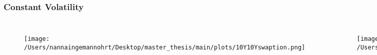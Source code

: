 \documentclass{beamer}
\begin{document}
\begin{frame}
    \frametitle{\textcolor{KUrod}{Constant Volatility}}

    \begin{columns}
        \begin{figure}
            \texttt{[image: /Users/nannaingemannohrt/Desktop/master\_thesis/main/plots/10Y10Yswaption.png]}
        \end{figure}
        
        \begin{figure}
            \texttt{[image: /Users/nannaingemannohrt/Desktop/master\_thesis/main/plots/10Y10Yswaptionreturn.png]}
        \end{figure}

        \begin{figure}
            \texttt{[image: /Users/nannaingemannohrt/Desktop/master\_thesis/main/plots/sp500.png]}
        \end{figure}
        
        \begin{figure}
            \texttt{[image: /Users/nannaingemannohrt/Desktop/master\_thesis/main/plots/sp500return.png]}
        \end{figure}
    \end{columns}

\end{frame}
\end{document}
